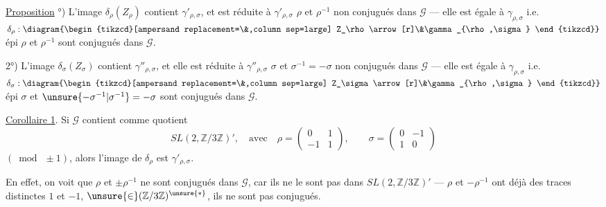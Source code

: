 

\uline{Proposition} °) L'image $\delta_\rho(Z_\rho)$ contient
$\gamma'_{\rho,\sigma}$, et est
réduite à $\gamma'_{\rho,\sigma}$ 
$\rho$ et $\rho^{-1}$ non conjugués dans $\mathcal{G}$ ---
 elle est égale à $\gamma_{\rho,\sigma}$
i.e.
$\delta_\rho:\diagram{\begin{tikzcd}[ampersand replacement=\&,column sep=large]
Z_\rho\arrow[r]\&\gamma_{\rho,\sigma}
\end{tikzcd}}$
épi  $\rho$ et $\rho^{-1}$ sont conjugués dans $\mathcal{G}$.

2°) L'image $\delta_\sigma(Z_\sigma)$ contient
$\gamma''_{\rho,\sigma}$, et elle est réduite à
$\gamma''_{\rho,\sigma}$  $\sigma$ et
$\sigma^{-1}=-\sigma$ non conjugués dans $\mathcal{G}$ ---
 elle est égale à $\gamma_{\rho,\sigma}$ i.e.
$\delta_\sigma:\diagram{\begin{tikzcd}[ampersand replacement=\&,column sep=large]
Z_\sigma\arrow[r]\&\gamma_{\rho,\sigma}
\end{tikzcd}}$
épi  $\sigma$ et
$\unsure{-\sigma^{-1}|\sigma^{-1}}=-\sigma$ sont conjugués dans $\mathcal{G}$.

\uline{Corollaire 1}. Si $\mathcal{G}$ contient comme quotient
\[
SL(2,\mathbb{Z}/3\mathbb{Z})',\quad\text{avec}\quad
\rho=\begin{pmatrix}0&1\\-1&1\end{pmatrix},\qquad
\sigma=\begin{pmatrix}0&-1\\1&0\end{pmatrix}
\]
$(\bmod\ \pm1)$, alors l'image de $\delta_\rho$ est
$\gamma'_{\rho,\sigma}$.

En effet, on voit que $\rho$ et $\pm\rho^{-1}$ ne sont
conjugués dans $\mathcal{G}$, car ils ne le sont
pas dans $SL(2,\mathbb{Z}/3\mathbb{Z})'$ ---
$\rho$ et $-\rho^{-1}$ ont déjà des traces distinctes
$1$ et $-1$, $\unsure{\in}(\mathbb{Z}/3\mathbb{Z})^{\unsure{*}}$,
ils ne sont pas conjugués.

